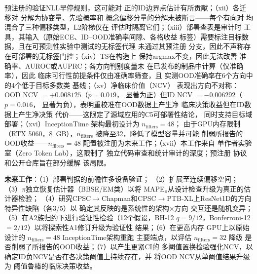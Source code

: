 预注册的验证NLL早停规则，这可能对
正的ID边界点估计有所贡献；（xii）各迁移对
分解为协变量、先验概率和
概念偏移分量的分解未被断言——每个有向对
均混合了三种偏移类型，L2阶梯仅在
评估时隔离它们；（xiii）部署查表是审计时
工具，其输入（原始ECE、ID--OOD准确率间隙、各格收益
标签）需要标注目标数据，且在可预测性实验中测试的无标签代理
未通过其预注册
分支，因此不声称存在可部署的无标签门控；（xiv）TS在构造上
保持argmax不变，因此无法改善
准确率、AUROC或AUPRC；各方向判别度量未
在已发布的制品中计算（仅准确率），因此
临床可行性前提条件仅由准确率筛查，且
实测OOD准确率在6个方向中的4个低于目标多数类
基线；（xv）净临床价值（NCV）
表现出方向不对称：OOD NCV $= +0.008125$（$p = 0.019$，
显著为正）但ID NCV $= -0.006292$（$p = 0.016$，
显著为负），表明重校准在OOD数据上产生净
临床决策收益但在ID数据上产生净决策
代价——这限定了源域应用的C5可部署性结论，
同时支持目标域部署；（xvi）InceptionTime
架构最初设计为 $n_{\text{filters}}=48$；
由于GPU内存限制（RTX 5060，8~GB），$n_{\text{filters}}$
被降至32，降低了模型容量并可能
削弱所报告的OOD收益——$n_{\text{filters}}=48$
配置被注册为未来工作；（xvii）本工作来自
单作者实验室（Zero Token Lab），这限制了
独立代码审查和统计审计的深度；预注册
协议和公开仓库旨在部分缓解
该局限。

\textbf{未来工作}：（1）部署判据的前瞻性多设备验证；
（2）扩展至连续偏移空间；
（3）$\pi$独立恢复估计器（BBSE/EM类）以将
MAPE$_\pi$从设计检查升级为真正的估计器检验；
（4）研究CPSC$\rightarrow$Chapman和CPSC$\rightarrow$PTB-XL上ResNet1D的方向特异性缺陷（各3/5）以
确定其反映的是系统性的架构$\times$方向
交互还是随机变异；（5）在A2族归约下进行验证性检验（12个假设，BH-12 $q=9/12$，Bonferroni-12
$=2/12$）以将探索性A1修订升级为验证性
结果；（6）在更高内存
GPU上以原始设计的 $n_{\text{filters}}=48$ InceptionTime架构重跑
主要端点，以评估 $n_{\text{filters}}=32$ 降级
是否削弱了所报告的OOD收益；（7）以产生更紧CI的
多阈值置换检验强化NCV，以
确定ID负NCV是否在各决策阈值上持续存在，并
将OOD NCV从单阈值结果升级为
阈值鲁棒的临床决策收益。

